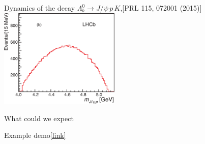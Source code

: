 \documentclass[aspectratio=169]{beamer}
\begin{document}
\begin{frame}{Dynamics of the decay $\Lambda_b^0\to J/\psi\,p\,K$,\hfill \scriptsize[PRL 115, 072001 (2015)]}{}
{\includegraphics[width=0.43\textwidth]{figs/PcOld/mjpsip-phsp_phase_space.pdf}}
\end{frame}

\begin{frame}{What could we expect}
    \begin{center}
        \Huge Example demo\quad\href{https://hub-binder.mybinder.ovh/user/mmikhasenko-201-rons-manchester-j8y5l8kk/apps/Examples/pentaquark_dalitzplot.ipynb}{\color{orange}[link]}\\[1cm]
        \qquad
    \end{center}
\end{frame}
\end{document}
